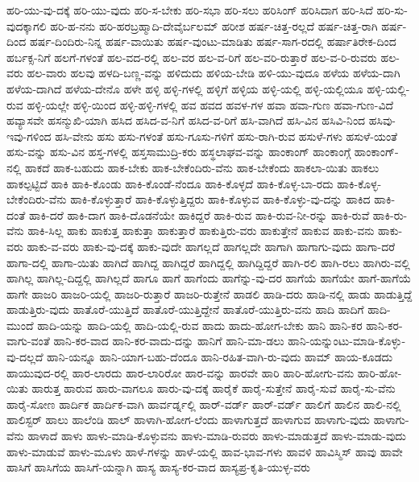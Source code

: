 {ಹರಿ-ಯು-ವು-ದಕ್ಕೆ
ಹರಿ-ಯು-ವುದು
ಹರಿ-ಸ-ಬೇಕು
ಹರಿ-ಸಭಾ
ಹರಿ-ಸಲು
ಹರಿಸಿಂಗ್
ಹರಿಸಿದಾಗ
ಹರಿ-ಸಿದೆ
ಹರಿ-ಸು-ವುದಕ್ಕಾಗಲಿ
ಹರಿ-ಹ-ನನು
ಹರಿ-ಹರಬ್ರಹ್ಮಾದಿ-ದೇವೈರ್ಬಲಮ್
ಹರೀಶ
ಹರ್ಷ-ಚಿತ್ತ-ರಲ್ಲದೆ
ಹರ್ಷ-ಚಿತ್ತ-ರಾಗಿ
ಹರ್ಷ-ದಿಂದ
ಹರ್ಷ-ದಿಂದಿರು-ನಿನ್ನ
ಹರ್ಷ-ವಾಯಿತು
ಹರ್ಷ-ವುಂಟು-ಮಾಡಿತು
ಹರ್ಷ-ಸಾಗ-ರದಲ್ಲಿ
ಹರ್ಷಾತಿರೇಕ-ದಿಂದ
ಹರ್ಬಕ್ಸ-ನಿಗೆ
ಹಲಗೆ-ಗಳಂತೆ
ಹಲ-ವದ-ರಲ್ಲಿ
ಹಲ-ವರ
ಹಲ-ವ-ರಿಗೆ
ಹಲ-ವರಿ-ರುತ್ತಾರೆ
ಹಲ-ವ-ರಿ-ರುವರು
ಹಲ-ವರು
ಹಲ-ವಾರು
ಹಲವು
ಹಳದಿ-ಬಣ್ಣ-ವನ್ನು
ಹಳಿದುದು
ಹಳಿಯ-ಬೇಡಿ
ಹಳಿ-ಯು-ವುದೂ
ಹಳೆಯ
ಹಳೆಯ-ದಾಗಿ
ಹಳೆಯ-ದಾಗಿದೆ
ಹಳೆಯ-ದೇನೊ
ಹಳೇ
ಹಳ್ಳಿ
ಹಳ್ಳಿ-ಗಳಲ್ಲಿ
ಹಳ್ಳಿಗೆ
ಹಳ್ಳಿಯ
ಹಳ್ಳಿ-ಯಲ್ಲಿ
ಹಳ್ಳಿ-ಯಲ್ಲಿಯೂ
ಹಳ್ಳಿ-ಯಲ್ಲಿ-ರುವ
ಹಳ್ಳಿ-ಯಲ್ಲೇ
ಹಳ್ಳಿ-ಯಿಂದ
ಹಳ್ಳಿ-ಹಳ್ಳಿ-ಗಳಲ್ಲಿ
ಹವ
ಹವದ
ಹವಳ-ಗಳ
ಹವಾ
ಹವಾ-ಗುಣ
ಹವಾ-ಗುಣ-ವಿದೆ
ಹವ್ಯಾಸವೇ
ಹಸನ್ಮುಖಿ-ಯಾಗಿ
ಹಸಿದ
ಹಸಿದ-ವ-ನಿಗೆ
ಹಸಿದ-ವ-ರಿಗೆ
ಹಸಿ-ವಾಗಿದೆ
ಹಸಿ-ವಿನ
ಹಸಿವಿ-ನಿಂದ
ಹಸಿವು-ಇವು-ಗಳಿಂದ
ಹಸಿ-ವೇನು
ಹಸು
ಹಸು-ಗಳಂತೆ
ಹಸು-ಗೂಸು-ಗಳಿಗೆ
ಹಸು-ರಾಗಿ-ರುವ
ಹಸುಳೆ-ಗಳು
ಹಸುಳೆ-ಯಂತೆ
ಹಸು-ವನ್ನು
ಹಸು-ವಿನ
ಹಸ್ತ-ಗಳಲ್ಲಿ
ಹಸ್ತಸಾಮುದ್ರಿ-ಕರು
ಹಸ್ಥಲಾಘವ-ವನ್ನು
ಹಾಂಕಾಂಗ್
ಹಾಂಕಾಂಗ್ಗೆ
ಹಾಂಕಾಂಗ್-ನಲ್ಲಿ
ಹಾಕದೆ
ಹಾಕ-ಬಹುದು
ಹಾಕ-ಬೇಕು
ಹಾಕ-ಬೇಕೆಂದಿರು-ವೆನು
ಹಾಕ-ಬೇಕೆಂದು
ಹಾಕಲಾ-ಯಿತು
ಹಾಕಲು
ಹಾಕಲ್ಪಟ್ಟಿದೆ
ಹಾಕಿ
ಹಾಕಿ-ಕೊಂಡು
ಹಾಕಿ-ಕೊಂಡೆ-ನೆಂದೂ
ಹಾಕಿ-ಕೊಳ್ಳದೆ
ಹಾಕಿ-ಕೊಳ್ಳ-ಬಾ-ರದು
ಹಾಕಿ-ಕೊಳ್ಳ-ಬೇಕೆಂದಿರು-ವೆನು
ಹಾಕಿ-ಕೊಳ್ಳುತ್ತಾರೆ
ಹಾಕಿ-ಕೊಳ್ಳುತ್ತಿದ್ದರು
ಹಾಕಿ-ಕೊಳ್ಳುವ
ಹಾಕಿ-ಕೊಳ್ಳು-ವು-ದನ್ನು
ಹಾಕಿದ
ಹಾಕಿ-ದಂತೆ
ಹಾಕಿ-ದರೆ
ಹಾಕಿ-ದಾಗ
ಹಾಕಿ-ದೊಡನೆಯೇ
ಹಾಕಿದ್ದರೆ
ಹಾಕಿ-ರುವ
ಹಾಕಿ-ರುವ-ನೀ-ರನ್ನು
ಹಾಕಿ-ರುವೆ
ಹಾಕಿ-ರು-ವೆನು
ಹಾಕಿ-ಸಿಲ್ಲ
ಹಾಕು
ಹಾಕುತ್ತ
ಹಾಕುತ್ತಾ
ಹಾಕುತ್ತಾರೆ
ಹಾಕುತ್ತಿರು-ವರು
ಹಾಕುತ್ತೇನೆ
ಹಾಕುವ
ಹಾಕು-ವನು
ಹಾಕು-ವರು
ಹಾಕು-ವ-ವರು
ಹಾಕು-ವು-ದಕ್ಕೆ
ಹಾಕು-ವುದೇ
ಹಾಗಲ್ಲದೆ
ಹಾಗಲ್ಲದೇ
ಹಾಗಾಗಿ
ಹಾಗಾಗು-ವುದು
ಹಾಗಾ-ದರೆ
ಹಾಗಾ-ದಲ್ಲಿ
ಹಾಗಾ-ಯಿತು
ಹಾಗಿದೆ
ಹಾಗಿದ್ದ
ಹಾಗಿದ್ದರೆ
ಹಾಗಿದ್ದಲ್ಲಿ
ಹಾಗಿದ್ದಿದ್ದರೆ
ಹಾಗಿ-ರಲಿ
ಹಾಗಿ-ರಲು
ಹಾಗಿರು-ವಲ್ಲಿ
ಹಾಗಿಲ್ಲ
ಹಾಗಿಲ್ಲ-ದಿದ್ದಲ್ಲಿ
ಹಾಗಿಲ್ಲದೆ
ಹಾಗೂ
ಹಾಗೆ
ಹಾಗೆಂದು
ಹಾಗೆನ್ನು-ವು-ದರ
ಹಾಗೆಯೆ
ಹಾಗೆಯೇ
ಹಾಗೆ-ಹಾಗೆಯೆ
ಹಾಗೇ
ಹಾಜರಿ
ಹಾಜರಿ-ಯಲ್ಲಿ
ಹಾಜರಿ-ರುತ್ತಾರೆ
ಹಾಜರಿ-ರುತ್ತೇನೆ
ಹಾಡಲಿ
ಹಾಡಿ-ದರು
ಹಾಡಿ-ನಲ್ಲಿ
ಹಾಡು
ಹಾಡುತ್ತಿದ್ದೆ
ಹಾಡುತ್ತಿರು-ವುದು
ಹಾತೊರೆ-ಯುತ್ತಿದೆ
ಹಾತೊರೆ-ಯುತ್ತಿದ್ದೇನೆ
ಹಾತೊರೆ-ಯುತ್ತಿರು-ವನು
ಹಾದಿ
ಹಾದಿಗೆ
ಹಾದಿ-ಮುಂದೆ
ಹಾದಿ-ಯನ್ನು
ಹಾದಿ-ಯಲ್ಲಿ
ಹಾದಿ-ಯಲ್ಲಿ-ರುವ
ಹಾದು
ಹಾದು-ಹೋಗ-ಬೇಕು
ಹಾನಿ
ಹಾನಿ-ಕರ
ಹಾನಿ-ಕರ-ವಾಗು-ವಂತೆ
ಹಾನಿ-ಕರ-ವಾದ
ಹಾನಿ-ಕರ-ವಾದು-ದನ್ನು
ಹಾನಿಗೆ
ಹಾನಿ-ಮಾ-ಡಲು
ಹಾನಿ-ಯನ್ನುಂಟು-ಮಾಡಿ-ಕೊಳ್ಳು-ವು-ದಲ್ಲದೆ
ಹಾನಿ-ಯನ್ನೂ
ಹಾನಿ-ಯಾಗ-ಬಹು-ದೆಂದೂ
ಹಾನಿ-ರಹಿತ-ವಾಗಿ-ರು-ವುದು
ಹಾಮ್
ಹಾಯ-ಕೂಡದು
ಹಾಯುವುದ-ರಲ್ಲಿ
ಹಾರ-ಲಾರದು
ಹಾರ-ಲಾರಿರೋ
ಹಾರ-ವನ್ನು
ಹಾರವೇ
ಹಾರಿ
ಹಾರಿ-ಹೋಗು-ವನು
ಹಾರಿ-ಹೋ-ಯಿತು
ಹಾರುತ್ತ
ಹಾರುವ
ಹಾರು-ವಾಗಲೂ
ಹಾರು-ವು-ದಕ್ಕೆ
ಹಾರೈಕೆ
ಹಾರೈ-ಸುತ್ತೇನೆ
ಹಾರೈ-ಸುವೆ
ಹಾರೈ-ಸು-ವೆನು
ಹಾರೈ-ಸೋಣ
ಹಾರ್ದಿಕ
ಹಾರ್ದಿಕ-ವಾಗಿ
ಹಾರ್ವರ್ಡ್ನಲ್ಲಿ
ಹಾರ್-ವರ್ಡ್
ಹಾರ್-ವರ್ಡ್
ಹಾಲಿಗೆ
ಹಾಲಿನ
ಹಾಲಿ-ನಲ್ಲಿ
ಹಾಲಿಸ್ಟರ್
ಹಾಲು
ಹಾಲೆಂಡಿ
ಹಾಲ್
ಹಾಳಾಗಿ-ಹೋಗ-ಲೆಂದು
ಹಾಳಾಗುತ್ತದೆ
ಹಾಳಾಗುವ
ಹಾಳಾಗು-ವುದು
ಹಾಳಾಗು-ವೆನು
ಹಾಳಾದೆ
ಹಾಳು
ಹಾಳು-ಮಾಡಿ-ಕೊಳ್ಳುವನು
ಹಾಳು-ಮಾಡಿ-ರುವರು
ಹಾಳು-ಮಾಡುತ್ತದೆ
ಹಾಳು-ಮಾಡು-ವುದು
ಹಾಳು-ಮಾಡುವೆ
ಹಾಳು-ಮೂಳು
ಹಾಳೆ-ಗಳನ್ನು
ಹಾಳೆ-ಯಲ್ಲಿ
ಹಾವ-ಭಾವ-ಗಳು
ಹಾವಳಿ
ಹಾವಿಸ್ಮಿಸ್
ಹಾವು
ಹಾವೇ
ಹಾಸಿಗೆ
ಹಾಸಿಗೆಯ
ಹಾಸಿಗೆ-ಯನ್ನಾಗಿ
ಹಾಸ್ಯ
ಹಾಸ್ಯ-ಕರ-ವಾದ
ಹಾಸ್ಯಪ್ರ-ಕೃತಿ-ಯುಳ್ಳ-ವರು
}
